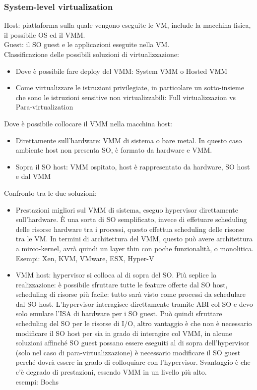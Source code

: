 \documentclass[16px]{article}
\begin{document}
\subsubsection{System-level virtualization}
Host: piattaforma sulla quale vengono eseguite le VM, include la macchina fisica, il possibile OS ed il VMM.\\ Guest: il SO guest e le applicazioni eseguite nella VM.\\ Classificazione delle possibili soluzioni di virtualizzazione:
\begin{itemize}
\item Dove è possibile fare deploy del VMM: System VMM o Hosted VMM
\item Come virtualizzare le istruzioni privilegiate, in particolare un sotto-insieme che sono le istruzioni sensitive non virtualizzabili: Full virtualizzazion vs Para-virtualization
\end{itemize}
Dove è possibile collocare il VMM nella macchina host:
\begin{itemize}
\item Direttamente sull'hardware: VMM di sistema o bare metal. In questo caso ambiente host non presenta SO, è formato da hardware e VMM.
\item Sopra il SO host: VMM ospitato, host è rappresentato da hardware, SO host e dal VMM
\end{itemize}
Confronto tra le due soluzioni:
\begin{itemize}
\item Prestazioni migliori sul VMM di sistema, eseguo hypervisor direttamente sull'hardware. È una sorta di SO semplificato, invece di effetuare scheduling delle risorse hardware tra i processi, questo effettua scheduling delle risorse tra le VM. In termini di architettura del VMM, questo può avere architettura a mirco-kernel, avrà quindi un layer thin con poche funzionalità, o monolitica. Esempi: Xen, KVM, VMware, ESX, Hyper-V
\item VMM host: hypervisor si colloca al di sopra del SO. Più seplice la realizzazione: è possibile sfruttare tutte le feature offerte dal SO host, scheduling di risorse più facile: tutto sarà visto come processi da schedulare dal SO host. L'hypervisor interagisce direttamente tramite ABI col SO e devo solo emulare l'ISA di hardware per i SO guest. Può quindi sfruttare scheduling del SO per le risorse di I/O, altro vantaggio è che non è necessario modificare il SO host per sia in grado di interagire col VMM, in alcune soluzioni affinché SO guest possano essere eseguiti al di sopra dell'hypervisor (solo nel caso di para-virtualizzazione) è necessario modificare il SO guest perché dovrà essere in grado di colloquiare con l'hypervisor. Svantaggio è che c'è degrado di prestazioni, essendo VMM in un livello più alto.\\ esempi: Bochs
\end{itemize}
\end{document}

